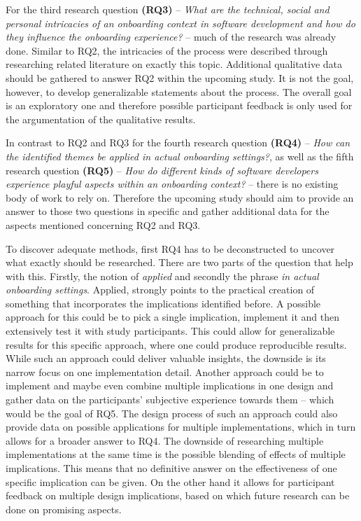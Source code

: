 For the third research question \textbf{(RQ3)} -- \textit{What are the technical, social and personal intricacies of an onboarding context in software development and how do they influence the onboarding experience?} -- much of the research was already done. Similar to RQ2, the intricacies of the process were described through researching related literature on exactly this topic. Additional qualitative data should be gathered to answer RQ2 within the upcoming study. It is not the goal, however, to develop generalizable statements about the process. The overall goal is an exploratory one and therefore possible participant feedback is only used for the argumentation of the qualitative results.

In contrast to RQ2 and RQ3 for the fourth research question \textbf{(RQ4)} -- \textit{How can the identified themes be applied in actual onboarding settings?}, as well as the fifth research question \textbf{(RQ5)} -- \textit{How do different kinds of software developers experience playful aspects within an onboarding context?} -- there is no existing body of work to rely on. Therefore the upcoming study should aim to provide an answer to those two questions in specific and gather additional data for the aspects mentioned concerning RQ2 and RQ3.

To discover adequate methods, first RQ4 has to be deconstructed to uncover what exactly should be researched. There are two parts of the question that help with this. Firstly, the notion of  \textit{applied} and secondly the phrase \textit{in actual onboarding settings}. Applied, strongly points to the practical creation of something that incorporates the implications identified before. A possible approach for this could be to pick a single implication, implement it and then extensively test it with study participants. This could allow for generalizable results for this specific approach, where one could produce reproducible results. While such an approach could deliver valuable insights, the downside is its narrow focus on one implementation detail. Another approach could be to implement and maybe even combine multiple implications in one design and gather data on the participants' subjective experience towards them -- which would be the goal of RQ5. The design process of such an approach could also provide data on possible applications for multiple implementations, which in turn allows for a broader answer to RQ4. The downside of researching multiple implementations at the same time is the possible blending of effects of multiple implications. This means that no definitive answer on the effectiveness of one specific implication can be given. On the other hand it allows for participant feedback on multiple design implications, based on which future research can be done on promising aspects.

